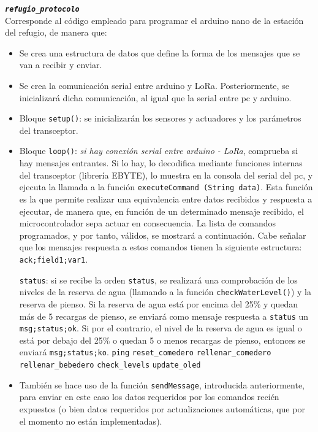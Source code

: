 \documentclass[12pt]{article}
\begin{document}
	\noindent \textbf{\texttt{\textit{refugio\_protocolo}}} \\
	
	\noindent Corresponde al código empleado para programar el arduino nano de la estación del refugio, de manera que: \\
	
	\begin{itemize}
		\item Se crea una estructura de datos que define la forma de los mensajes que se van a recibir y enviar.
		\item Se crea la comunicación serial entre arduino y LoRa. Posteriormente, se inicializará dicha comunicación, al igual que la serial entre pc y arduino.
		\item Bloque \texttt{setup()}: se inicializarán los sensores y actuadores y los parámetros del transceptor.
		\item Bloque \texttt{loop()}: \textit{si hay conexión serial entre arduino - LoRa}, comprueba si hay mensajes entrantes. Si lo hay, lo decodifica mediante funciones internas del transceptor (librería EBYTE), lo muestra en la consola del serial del pc, y ejecuta la llamada a la función \texttt{executeCommand (String data)}. Esta función es la que permite realizar una equivalencia entre datos recibidos y respuesta a ejecutar, de manera que, en función de un determinado mensaje recibido, el microcontrolador sepa actuar en consecuencia. La lista de comandos programados, y por tanto, válidos, se mostrará a continuación. Cabe señalar que los mensajes respuesta a estos comandos tienen la siguiente estructura: \texttt{ack;field1;var1}.
			\begin{outline}
				\1 \texttt{status}: si se recibe la orden \texttt{status}, se realizará una comprobación de los niveles de la reserva de agua (llamando a la función \texttt{checkWaterLevel()}) y la reserva de pienso. Si la reserva de agua está por encima del 25\% y quedan más de 5 recargas de pienso, se enviará como mensaje respuesta a \texttt{status} un \texttt{msg;status;ok}. Si por el contrario, el nivel de la reserva de agua es igual o está por debajo del 25\% o quedan 5 o menos recargas de pienso, entonces se enviará \texttt{msg;status;ko}. 
				\1 \texttt{ping}
				\1 \texttt{reset\_comedero}
				\1 \texttt{rellenar\_comedero}
				\1 \texttt{rellenar\_bebedero}
				\1 \texttt{check\_levels}
				\1 \texttt{update\_oled}
			\end{outline}
		\item También se hace uso de la función \texttt{sendMessage}, introducida anteriormente, para enviar en este caso los datos requeridos por los comandos recién expuestos (o bien datos requeridos por actualizaciones automáticas, que por el momento no están implementadas).
	\end{itemize}
\end{document}
